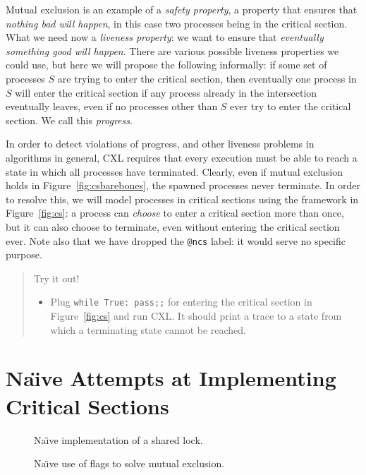 \documentclass{report}
\newenvironment{code}{
\tcolorbox
}{
\endtcolorbox
}
\begin{document}
Mutual exclusion is an example of a \emph{safety property}, a
property that ensures that \emph{nothing bad will happen}, in this case
two processes being in the critical section.
What we need now a \emph{liveness property}: we want to ensure that
\emph{eventually something good will happen}.
There are various possible liveness properties we could use,
but here we will propose the following informally: if some set of processes
$S$ are trying to enter the critical section, then eventually one process in
$S$ will enter the critical section if any process already in the
intersection eventually leaves, even if no processes other than $S$ ever
try to enter the critical section.
We call this \emph{progress}.

In order to detect violations of progress, and other liveness problems in
algorithms in general, CXL requires that every execution must be
able to reach a state in which all processes have terminated.
Clearly, even if mutual exclusion holds in Figure~\ref{fig:csbarebones},
the spawned processes never terminate.  In order to resolve this, we
will model processes in critical sections using the framework in
Figure~\ref{fig:cs}: a process can \emph{choose} to enter a
critical section more than once, but it can also choose to terminate, even
without entering the critical section ever.
Note also that we have dropped the \texttt{@ncs} label: it would serve no
specific purpose.

\begin{quote}
Try it out!
\begin{itemize}
\item Plug \texttt{while True: pass;;} for entering the critical section
in Figure~\ref{fig:cs} and run CXL.  It should print a trace
to a state from which a terminating state cannot be reached.
\end{itemize}
\end{quote}


\chapter{Na\"{\i}ve Attempts at Implementing Critical Sections}

\begin{figure}
\begin{code}

\end{code}
\caption{Na\"{\i}ve implementation of a shared lock.}
\label{fig:uplock}
\end{figure}

\begin{figure}
\begin{code}

\end{code}
\caption{Na\"{\i}ve use of flags to solve mutual exclusion.}
\label{fig:upflags}
\end{figure}
\end{document}
